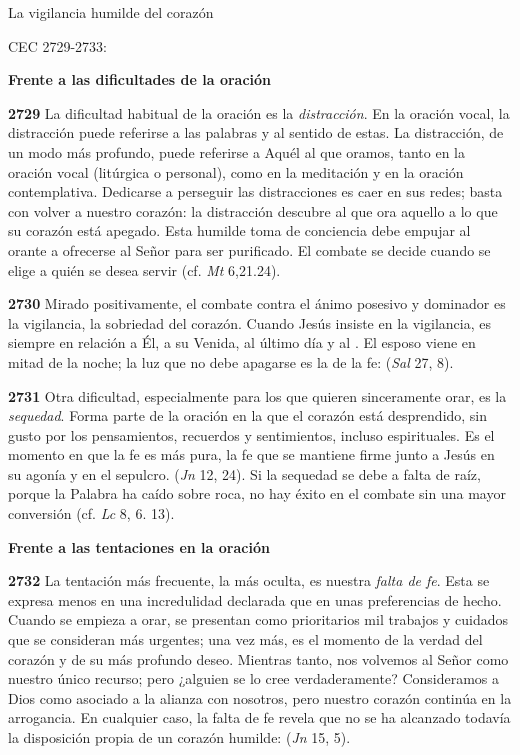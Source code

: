 La vigilancia humilde del corazón

CEC 2729-2733:

\textbf{Frente a las dificultades de la oración}

\textbf{2729} La dificultad habitual de la oración es la \emph{distracción}. En la oración vocal, la distracción puede referirse a las palabras y al sentido de estas. La distracción, de un modo más profundo, puede referirse a Aquél al que oramos, tanto en la oración vocal (litúrgica o personal), como en la meditación y en la oración contemplativa. Dedicarse a perseguir las distracciones es caer en sus redes; basta con volver a nuestro corazón: la distracción descubre al que ora aquello a lo que su corazón está apegado. Esta humilde toma de conciencia debe empujar al orante a ofrecerse al Señor para ser purificado. El combate se decide cuando se elige a quién se desea servir (cf. \emph{Mt} 6,21.24).

\textbf{2730} Mirado positivamente, el combate contra el ánimo posesivo y dominador es la vigilancia, la sobriedad del corazón. Cuando Jesús insiste en la vigilancia, es siempre en relación a Él, a su Venida, al último día y al . El esposo viene en mitad de la noche; la luz que no debe apagarse es la de la fe:  (\emph{Sal} 27, 8).

\textbf{2731} Otra dificultad, especialmente para los que quieren sinceramente orar, es la \emph{sequedad}. Forma parte de la oración en la que el corazón está desprendido, sin gusto por los pensamientos, recuerdos y sentimientos, incluso espirituales. Es el momento en que la fe es más pura, la fe que se mantiene firme junto a Jesús en su agonía y en el sepulcro.  (\emph{Jn} 12, 24). Si la sequedad se debe a falta de raíz, porque la Palabra ha caído sobre roca, no hay éxito en el combate sin una mayor conversión (cf. \emph{Lc} 8, 6. 13).



\textbf{Frente a las tentaciones en la oración}

\textbf{2732} La tentación más frecuente, la más oculta, es nuestra \emph{falta de fe}. Esta se expresa menos en una incredulidad declarada que en unas preferencias de hecho. Cuando se empieza a orar, se presentan como prioritarios mil trabajos y cuidados que se consideran más urgentes; una vez más, es el momento de la verdad del corazón y de su más profundo deseo. Mientras tanto, nos volvemos al Señor como nuestro único recurso; pero ¿alguien se lo cree verdaderamente? Consideramos a Dios como asociado a la alianza con nosotros, pero nuestro corazón continúa en la arrogancia. En cualquier caso, la falta de fe revela que no se ha alcanzado todavía la disposición propia de un corazón humilde:  (\emph{Jn} 15, 5).

